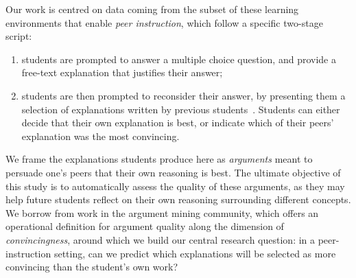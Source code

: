 \documentclass[runningheads]{llncs}
\begin{document}

Our work is centred on data coming from the subset of these learning 
environments that enable \textit{peer instruction}\cite{crouch_peer_2001}, 
which follow a specific two-stage script: 
\begin{enumerate}
	\item students are prompted to answer a multiple choice question, and 
	provide a free-text explanation that justifies their answer;
	\item students are then prompted to reconsider their answer, by presenting 
	them a selection of explanations written by previous 
	students~\cite{bhatnagar_dalite:_2016}.
	Students can either decide that their own explanation is best, or indicate 
	which of their peers' explanation was the most convincing.
\end{enumerate}

We frame the explanations students produce here as \textit{arguments} 
meant to persuade one's peers that their own reasoning is best.
The ultimate objective of this study is to automatically assess the quality of 
these arguments, as they may help future students reflect on their own 
reasoning surrounding different concepts.
We borrow from work in the argument mining community, which offers an 
operational definition for argument quality along the dimension of 
\textit{convincingness}, around which we build our central research question: 
in a peer-instruction setting, can we predict which explanations will be 
selected as more convincing than the student's own work? 
\end{document}
